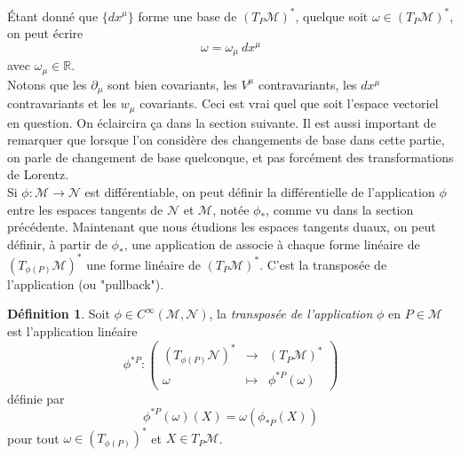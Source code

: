 \documentclass[a4paper,11pt]{report}
\theoremstyle{definition}
\theoremstyle{plain}
\theoremstyle{definition}
\newtheorem{defn}{Définition}[chapter]
\theoremstyle{remark}
\newcommand{\M}{\mathscr{M}}
\newcommand{\N}{\mathscr{N}}
\newcommand{\p}{\partial}
\begin{document}
                Étant donné que $\{dx^\mu\}$ forme une base de $(T_P\M)^*$, quelque soit $\omega\in(T_P\M)^*$, on peut écrire
                \begin{equation}
                    \omega = \omega_\mu~dx^\mu
                \end{equation}
                avec $\omega_\mu\in\mathbb{R}$.\\
                
                Notons que les $\p_\mu$ sont bien covariants, les $V^\mu$ contravariants, les $dx^\mu$ contravariants et les $w_\mu$ covariants. Ceci est vrai quel que soit l'espace vectoriel en question. On éclaircira ça dans la section suivante. Il est aussi important de remarquer que lorsque l'on considère des changements de base dans cette partie, on parle de changement de base quelconque, et pas forcément des transformations de Lorentz.\\
                
                Si $\phi:\M\to\N$ est différentiable, on peut définir la différentielle de l'application $\phi$ entre les espaces tangents de $\N$ et $\M$, notée $\phi_*$, comme vu dans la section précédente. Maintenant que nous étudions les espaces tangents duaux, on peut définir, à partir de $\phi_*$, une application de associe à chaque forme linéaire de $(T_{\phi(P)}\M)^*$ une forme linéaire de $(T_P\M)^*$. C'est la transposée de l'application (ou "pullback").
                
                \begin{defn}
                    Soit $\phi\in C^\infty(\M,\N)$, la \textit{transposée de l'application} $\phi$ en $P\in\M$ est l'application linéaire
                    \begin{equation}
                        \phi^{*P}:\left(
                    \begin{array}{ccc}
                        (T_{\phi(P)}\N)^* & \longrightarrow & (T_P\M)^* \\
                        \omega & \longmapsto & \phi^{*P}(\omega)
                    \end{array}
                    \right)
                    \end{equation}
                    définie par
                    \begin{equation}
                        \phi^{*P}(\omega)(X) = \omega(\phi_{*P}(X))
                    \end{equation}
                    pour tout $\omega\in (T_{\phi(P)})^*$ et $X\in T_P\M$.
                \end{defn}
            
\end{document}
